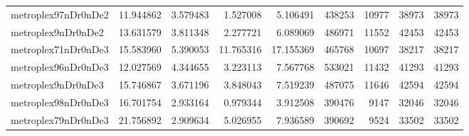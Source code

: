 \begin{longtable}{|l|r|r|r|r|r|r|r|r|}
metroplex97nDr0nDe2 & 11.944862 & 3.579483 & 1.527008 & 5.106491 & 438253 & 10977 & 38973 & 38973 \\
metroplex9nDr0nDe2 & 13.631579 & 3.811348 & 2.277721 & 6.089069 & 486971 & 11552 & 42453 & 42453 \\
metroplex71nDr0nDe3 & 15.583960 & 5.390053 & 11.765316 & 17.155369 & 465768 & 10697 & 38217 & 38217 \\
metroplex96nDr0nDe3 & 12.027569 & 4.344655 & 3.223113 & 7.567768 & 533021 & 11432 & 41293 & 41293 \\
metroplex9nDr0nDe3 & 15.746867 & 3.671196 & 3.848043 & 7.519239 & 487075 & 11646 & 42594 & 42594 \\
metroplex98nDr0nDe3 & 16.701754 & 2.933164 & 0.979344 & 3.912508 & 390476 & 9147 & 32046 & 32046 \\
metroplex79nDr0nDe3 & 21.756892 & 2.909634 & 5.026955 & 7.936589 & 390692 & 9524 & 33502 & 33502 \\
\end{longtable}
